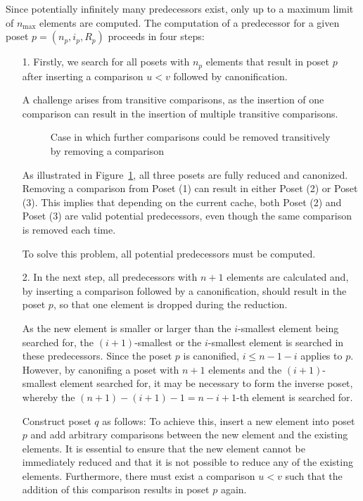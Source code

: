 \documentclass[10pt,journal,compsoc]{IEEEtran}
\begin{document}
Since potentially infinitely many predecessors exist, only up to a maximum limit of $n_{\text{max}}$ elements are computed.
The computation of a predecessor for a given poset $p = (n_p, i_p, R_p)$ proceeds in four steps:

\begin{itemize}
  \item[1.]
    Firstly, we search for all posets with $n_p$ elements that result in poset $p$ after inserting a comparison $u < v$ followed by canonification.

    A challenge arises from transitive comparisons, as the insertion of one comparison can result in the insertion of multiple transitive comparisons.

    \begin{figure}
      \centering
      
      \caption{Case in which further comparisons could be removed transitively by removing a comparison}
      \label{fig:backward_problematic}
    \end{figure}

    As illustrated in Figure~\ref{fig:backward_problematic}, all three posets are fully reduced and canonized.
    Removing a comparison from Poset (1) can result in either Poset (2) or Poset (3).
    This implies that depending on the current cache, both Poset (2) and Poset (3) are valid potential predecessors, even though the same comparison is removed each time.

    To solve this problem, all potential predecessors must be computed.

  \item[2.]
    In the next step, all predecessors with $n + 1$ elements are calculated and, by inserting a comparison followed by a canonification, should result in the poset $p$, so that one element is dropped during the reduction.

    As the new element is smaller or larger than the $i$-smallest element being searched for, the $(i + 1)$-smallest or the $i$-smallest element is searched in these predecessors. Since the poset $p$ is canonified, $i \leq n - 1 - i$ applies to $p$. However, by canonifing a poset with $n + 1$ elements and the $(i + 1)$-smallest element searched for, it may be necessary to form the inverse poset, whereby the $(n + 1) - (i + 1) - 1 = n - i + 1$-th element is searched for.

    Construct poset $q$ as follows:
    To achieve this, insert a new element into poset $p$ and add arbitrary comparisons between the new element and the existing elements.
    It is essential to ensure that the new element cannot be immediately reduced and that it is not possible to reduce any of the existing elements.
    Furthermore, there must exist a comparison $u < v$ such that the addition of this comparison results in poset $p$ again.


\end{itemize}
\end{document}
